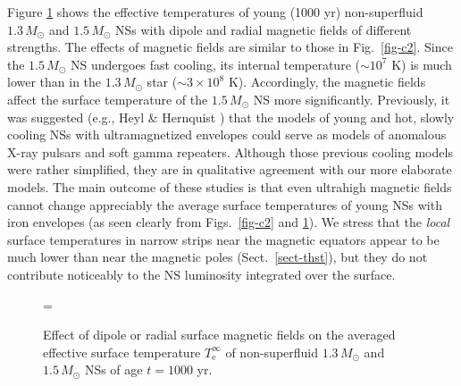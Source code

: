 \documentclass{aa}
\begin{document}
Figure \ref{fig-c3} shows the effective
temperatures
of young (1000 yr) non-superfluid $1.3 \, M_\odot$
and $1.5 \, M_\odot$ NSs with dipole and
radial magnetic fields of different strengths.
The effects of magnetic fields are similar to
those in Fig.\ \ref{fig-c2}.
Since the $1.5 \, M_\odot$ NS undergoes fast cooling,
its internal temperature ($\sim 10^7$ K)
is much lower
than in the $1.3 \, M_\odot$ star ($\sim 3 \times 10^8$ K).
Accordingly, the magnetic fields
affect the surface temperature of the $1.5 \, M_\odot$
NS more significantly. Previously,
it was suggested (e.g., Heyl \& Hernquist \cite{HH97})
that the models of
young and hot, slowly
cooling NSs with ultramagnetized envelopes 
could serve as models of anomalous X-ray pulsars and
soft gamma repeaters.
Although those previous cooling models were rather simplified, 
they are in qualitative agreement with our
more elaborate models.
The main outcome of these studies is that even
ultrahigh magnetic fields cannot change appreciably
the average surface temperatures of young
NSs with iron envelopes (as seen clearly 
from Figs.\ \ref{fig-c2} and \ref{fig-c3}).
We stress that the
\emph{local} surface temperatures in narrow strips
near the magnetic equators appear to be much
lower than near the magnetic poles (Sect.\ \ref{sect-thst}),
but they do not contribute noticeably to the
NS luminosity integrated over the surface.

\begin{figure}
\centering
\epsfxsize=\hsize
\caption{Effect of dipole or radial surface
magnetic fields on the averaged
effective surface temperature $T_\mathrm{e}^\infty$
of non-superfluid $1.3 \, M_\odot$ and $1.5 \, M_\odot$
NSs of age $t=1000$ yr.
}
\label{fig-c3}
\end{figure}
\end{document}
